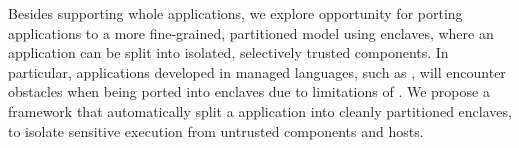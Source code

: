 Besides supporting whole applications,
we explore opportunity for porting applications
to a more fine-grained, partitioned model
using enclaves,
where an application can be
split into isolated, selectively trusted components.
In particular,
applications developed in managed languages, such as \java{},
will encounter obstacles
when being ported into enclaves
due to limitations of \intel{} \sgx{}.
We propose a framework that automatically split a \java{} application
into cleanly partitioned enclaves,
to isolate sensitive execution from untrusted components and hosts.



